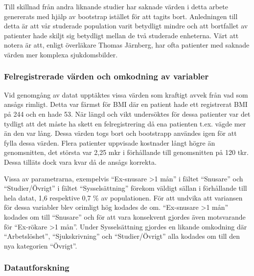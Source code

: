 Till skillnad från andra liknande studier har saknade värden i detta arbete genererats med hjälp av bootstrap istället för att tagits bort. Anledningen till detta är att vår studerade population varit betydligt mindre och att bortfallet av patienter hade skiljt sig betydligt mellan de två studerade enheterna. Värt att notera är att, enligt överläkare Thomas Järnberg,  har ofta patienter med saknade värden mer komplexa sjukdomsbilder. 

\subsubsection{Felregistrerade värden och omkodning av variabler}
Vid genomgång av datat upptäktes vissa värden som kraftigt avvek från vad som ansågs rimligt. Detta var färmst för BMI där en patient hade ett registrerat BMI på 244 och en hade 53. När längd och vikt undersöktes för dessa patienter var det tydligt att det måste ha skett en felregistrering då ena patienten t.ex. vägde mer än den var lång. Dessa värden togs bort och bootstrapp användes igen för att fylla dessa värden. Flera patienter uppvisade kostnader långt högre än genomsnitten, det största var 2,25 mkr i förhållande till genomsnitten på 120 tkr. Dessa tilläts dock vara kvar då de ansågs korrekta.

Vissa av parametrarna, exempelvis “Ex-snusare >1 mån” i fältet “Snusare” och “Studier/Övrigt” i fältet “Sysselsättning” förekom väldigt sällan i förhållande till hela datat, 1,6 respektive 0,7 \% av populationen. För att undvika att variansen för dessa variabler blev orimligt hög kodades de om. “Ex-snusare >1 mån” kodades om till “Snusare” och för att vara konsekvent gjordes även motsvarande för “Ex-rökare >1 mån”. Under Sysselsättning gjordes en likande omkodning där “Arbetslöshet”, “Sjukskrivning” och “Studier/Övrigt” alla kodades om till den nya kategorien “Övrigt”.

\subsubsection{Datautforskning}


